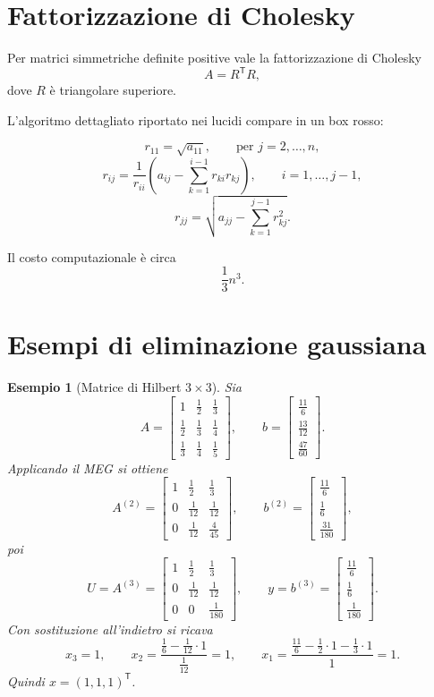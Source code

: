 \documentclass[11pt,a4paper]{report}
\newtheorem{example}[theorem]{Esempio}
\newcommand{\trans}{^{\mathsf T}}
\begin{document}
\section{Fattorizzazione di Cholesky}
Per matrici simmetriche definite positive vale la fattorizzazione di Cholesky
\[
A=R\trans R,
\]
dove $R$ \`e triangolare superiore.

L'algoritmo dettagliato riportato nei lucidi compare in un box rosso:

\begin{nonExamBox}
\[
r_{11}=\sqrt{a_{11}},
\qquad
\text{per } j=2,\dots,n,
\]
\[
 r_{ij}=\frac{1}{r_{ii}}\left(a_{ij}-\sum_{k=1}^{i-1} r_{ki}r_{kj}\right),
 \qquad i=1,\dots,j-1,
\]
\[
 r_{jj}=\sqrt{a_{jj}-\sum_{k=1}^{j-1}r_{kj}^2}.
\]
\end{nonExamBox}

Il costo computazionale \`e circa
\[
\frac{1}{3}n^3.
\]

\section{Esempi di eliminazione gaussiana}

\begin{example}[Matrice di Hilbert $3\times 3$]
Sia
\[
A=\begin{bmatrix}
1 & \frac12 & \frac13\\
\frac12 & \frac13 & \frac14\\
\frac13 & \frac14 & \frac15
\end{bmatrix},
\qquad
b=\begin{bmatrix}
\frac{11}{6}\\[2mm]
\frac{13}{12}\\[2mm]
\frac{47}{60}
\end{bmatrix}.
\]
Applicando il MEG si ottiene
\[
A^{(2)}=
\begin{bmatrix}
1 & \frac12 & \frac13\\
0 & \frac1{12} & \frac1{12}\\
0 & \frac1{12} & \frac4{45}
\end{bmatrix},
\qquad
b^{(2)}=
\begin{bmatrix}
\frac{11}{6}\\[2mm]
\frac16\\[2mm]
\frac{31}{180}
\end{bmatrix},
\]
poi
\[
U=A^{(3)}=
\begin{bmatrix}
1 & \frac12 & \frac13\\
0 & \frac1{12} & \frac1{12}\\
0 & 0 & \frac1{180}
\end{bmatrix},
\qquad
y=b^{(3)}=
\begin{bmatrix}
\frac{11}{6}\\[2mm]
\frac16\\[2mm]
\frac1{180}
\end{bmatrix}.
\]
Con sostituzione all'indietro si ricava
\[
 x_3=1,
 \qquad
 x_2=\frac{\frac16-\frac1{12}\cdot 1}{\frac1{12}}=1,
 \qquad
 x_1=\frac{\frac{11}{6}-\frac12\cdot 1-\frac13\cdot 1}{1}=1.
\]
Quindi $x=(1,1,1)\trans$.
\end{example}
\end{document}
